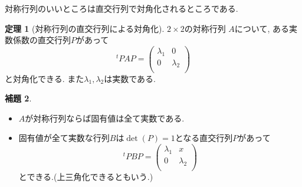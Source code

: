 \documentclass[dvipdfmx,a4paper,11pt]{article}
\theoremstyle{definition}
\newtheorem{thm}{定理}
\newtheorem{lem}[thm]{補題}
\begin{document}
対称行列のいいところは直交行列で対角化されるところである.
  \begin{tcolorbox}[
    colback = white,
    colframe = green!35!black,
    fonttitle = \bfseries,
    breakable = true]
    \begin{thm}[対称行列の直交行列による対角化]
$2 \times 2$の対称行列
$A$について, ある実数係数の直交行列$P$があって
$$
{}^tPA P=
\begin{pmatrix}
\lambda_1& 0 \\
0& \lambda_2\\
\end{pmatrix}
$$
と対角化できる. また$\lambda_1,\lambda_2$は実数である. 
  \end{thm}
 \end{tcolorbox}
 
 
 
 
  \begin{tcolorbox}[
    colback = white,
    colframe = green!35!black,
    fonttitle = \bfseries,
    breakable = true]
    \begin{lem}
\begin{itemize}
\setlength{\parskip}{0cm}
 \setlength{\itemsep}{0pt} 
\item $A$が対称行列ならば固有値は全て実数である.
\item 固有値が全て実数な行列$B$は$\det(P)=1$となる直交行列$P$があって
$$
{}^tP BP=
\begin{pmatrix}
\lambda_1& x \\
0& \lambda_2\\
\end{pmatrix}
$$
とできる.(上三角化できるともいう.)
\end{itemize}
\end{lem}
 \end{tcolorbox}
 


 
\end{document}
